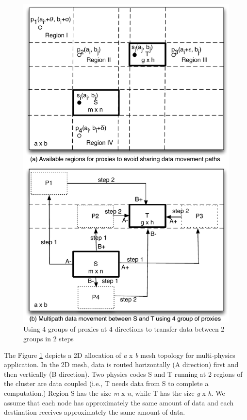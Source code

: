 \documentclass[final,5p,times]{elsarticle}
\begin{document}
\begin{figure}[!htb]
\vspace{-0.1in}
\centering
\includegraphics[scale=0.5]{figures/groxies.pdf}
\vspace{-0.1in}
\caption{Using 4 groups of proxies at 4 directions to transfer data between 2 groups in 2 steps}
\vspace{-0.2in}
\label{fig:groxies}
\end{figure}

The Figure \ref{fig:groxies} depicts a 2D allocation of \textit{a} x \textit{b} mesh topology for multi-physics application. In the 2D mesh, data is routed horizontally (A direction) first and then vertically (B direction). Two physics codes S and T running at 2 regions of the cluster are data coupled (i.e., T needs data from S to complete a computation.) Region S has the size \textit{m} x \textit{n}, while T has the size \textit{g} x \textit{h}. We assume that each node has approximately the same amount of data and each destination receives approximately the same amount of data.
\end{document}
